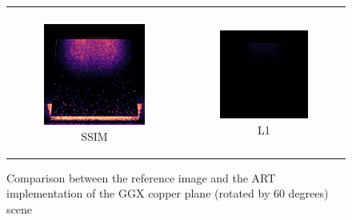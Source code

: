 \begin{figure}[h]
\begin{tabular}{cc}
\begin{subfigure}
			\caption{ART - our implementation}
		\end{subfigure} \\
		\begin{subfigure}
			{0.4\textwidth}\centering\includegraphics[width=\linewidth]{img/ggx_copper_60_SSIM.png}
			\caption{SSIM}
		\end{subfigure} 
		&
		\begin{subfigure}
			{0.4\textwidth}\centering\includegraphics[width=\linewidth]{img/ggx_copper_60_L1.png}
			\caption{L1}
		\end{subfigure}
	\end{tabular}
	\caption{Comparison between the reference image and the ART implementation of the GGX copper plane (rotated by 60 degrees) scene}
	\label{fig:compare_ggx_copper}
\end{figure}


